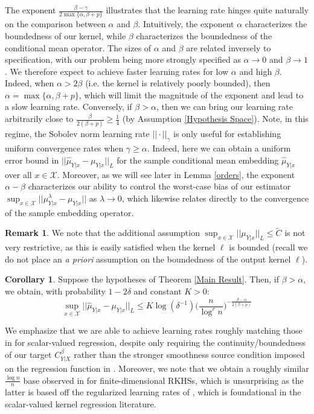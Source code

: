 \documentclass[accepted]{article}
\theoremstyle{definition}
\newtheorem*{remark}{Remark}
\newtheorem{corollary}{Corollary}[theorem]
\begin{document}
The exponent $\frac{\beta - \gamma}{2\max \{\alpha,  \beta + p\}}$ illustrates that the learning rate hinges quite naturally on the comparison between $\alpha$ and $\beta$. Intuitively, the exponent $\alpha$ characterizes the boundedness of our kernel, while $\beta$ characterizes the boundedness of the conditional mean operator. The sizes of $\alpha$ and $\beta$ are related inversely to specification, with our problem being more strongly specified as $\alpha \to 0$ and $\beta \to 1$. We therefore expect to achieve faster learning rates for low $\alpha$ and high $\beta$. Indeed, when $\alpha > 2\beta$ (i.e. the kernel is relatively poorly bounded), then $\alpha = \max \{\alpha,  \beta + p\}$, which will limit the magnitude of the exponent and lead to a slow learning rate. Conversely, if $\beta > \alpha$, then we can bring our learning rate arbitrarily close to $\frac{\beta}{2(\beta + p)} \geq \frac{1}{4}$ (by Assumption \ref{Hypothesis Space}). Note, in this regime, the Sobolev norm learning rate $||\cdot||_{\gamma}$  is only useful for establishing uniform convergence rates when $\gamma \geq \alpha$. Indeed, here we can obtain a uniform error bound in $||\hat{\mu}_{Y|x} - \mu_{Y|x}||_{L}$ for the sample conditional mean embedding $\hat{\mu}_{Y|x}$ over all $x \in \mathcal{X}$. Moreover, as we will see later in Lemma \ref{orders}, the exponent $\alpha - \beta$ characterizes our ability to control the worst-case bias of our estimator $\sup_{x \in \mathcal{X}} ||\mu^{\lambda}_{Y|x} - \mu_{Y|x}||$ as $\lambda \to 0$, which likewise relates directly to the convergence of the sample embedding operator. 


\begin{remark}
We note that the additional assumption $\sup_{x \in \mathcal{X}} ||\mu_{Y|x}||_{L} \leq \tilde{C}$ is not very restrictive, as this is easily satisfied when the kernel $\ell$ is bounded (recall we do not place an \textit{a priori} assumption on the boundedness of the output kernel $\ell$). 
\end{remark}
\begin{corollary}
\label{Main Corollary}
Suppose the hypotheses of Theorem \ref{Main Result}. Then, if $\beta > \alpha$, we obtain, with probability $1 - 2\delta$ and constant $K > 0$:
\begin{equation*}
    \sup_{x \in \mathcal{X}} ||\hat{\mu}_{Y|x} - \mu_{Y|x}||_{L} \leq K\log(\delta^{-1})\Big(\frac{n}{\log^r n}\Big)^{-\frac{\beta - \alpha}{2(\beta + p)}}
\end{equation*}
\end{corollary}
We emphasize that we are able to achieve learning rates roughly matching those in \cite{fischer2020sobolev} for scalar-valued regression, despite only requiring the continuity/boundedness of our target $C^{\beta}_{Y|X}$ rather than the stronger smoothness source condition imposed on the regression function in \cite{fischer2020sobolev}. Moreover, we note that we obtain a roughly similar $\frac{\log n}{n}$ base observed in \cite{grunewalder2012conditional} for finite-dimensional RKHSs, which is unsurprising as the latter is based off the regularized learning rates of 
\cite{caponnetto2007optimal}, which is foundational in the scalar-valued kernel regression literature.  
\end{document}
